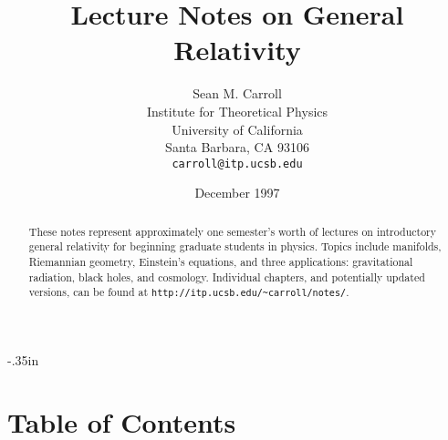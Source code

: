 \textheight 8.5in \textwidth 6.5in \oddsidemargin 0in \topmargin -.35in
\renewcommand{\arraystretch}{1.5}
\renewcommand{\theequation}{\thesection.\arabic{equation}}
\renewcommand{\thepage}{\roman{page}}
\pagestyle{headings}


\newcommand{\be}{\begin{equation}}
\newcommand{\ee}{\end{equation}}
\newcommand{\bea}{\begin{eqnarray}}
\newcommand{\eea}{\end{eqnarray}}

\baselineskip=16pt
\def\boxx{\Box}
\def\mn{{\mu\nu}}
\def\e#1{{\hat e}_{(#1)}}
\def\t#1{{\hat \theta}^{(#1)}}
\def\p#1{{\partial}_{#1}}
\def\d{{\rm d}}
\def\R{{\bf R}}
\def\g{{\sqrt{-g}}}
\def\tr{\mathop{\rm Tr}\nolimits}
\def\lie{\pounds}
\def\bh{{\bar h}}
\def\x{{\bf x}}
\def\y{{\bf y}}
\def\k{{\bf k}}

\thispagestyle{plain}
\setcounter{page}{0}

\title{Lecture Notes on General Relativity}

\author{Sean M. Carroll \\ Institute for Theoretical Physics \\
University of California \\ Santa Barbara, CA 93106 \\
{\tt carroll@itp.ucsb.edu}}

\date{December 1997}

\maketitle

\begin{abstract}
These notes represent approximately one semester's worth of lectures
on introductory general relativity for beginning graduate students
in physics.  Topics include manifolds, Riemannian geometry,
Einstein's equations, and three applications: gravitational radiation,
black holes, and cosmology.
Individual chapters, and potentially updated versions, can be found at
{\tt http://itp.ucsb.edu/{\~{}}carroll/notes/}.
\end{abstract}

\vfill


\eject

\section*{Table of Contents}

